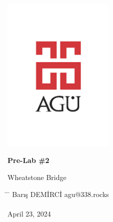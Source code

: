 \begin{center}
	\includegraphics[width=0.4\textwidth]{assets/agu.png}

	\Huge
	\textbf{Pre-Lab \#2}

	\vspace{0.3cm}
	\Huge
	Wheatstone Bridge

	\vspace{0.8cm}
	\large
	\vspace{0.5cm}
	\LARGE
	\vspace{1.5cm}
	\textbf{}
	\vfill
	\vspace{0.8cm}
	\Large
\end{center}

\begin{tabbing}
	\hspace*{1em}\= \hspace*{8em} \= \kill
	\> Barış DEMİRCİ \> agu@338.rocks \\
	\> \> \\
	\> April 23, 2024 \> \\
\end{tabbing}
